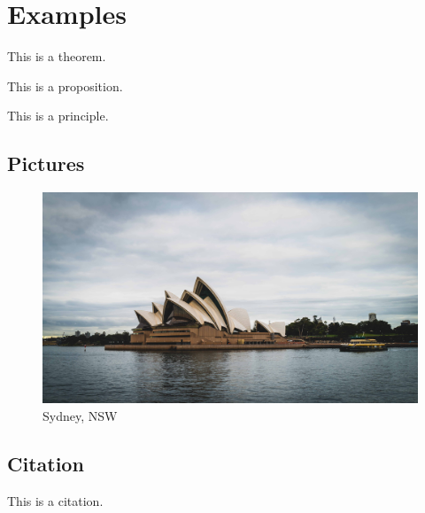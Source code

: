 \documentclass{article}
\begin{document}
\section{Examples}

\begin{theorem}
    This is a theorem.
\end{theorem}

\begin{proposition}
    This is a proposition.
\end{proposition}

\begin{principle}
    This is a principle.
\end{principle}


\subsection{Pictures}

\begin{figure}[htbp]
    \center
    \includegraphics[scale=0.06]{img/photo.jpg}
    \caption{Sydney, NSW}
\end{figure}

\subsection{Citation}

This is a citation\cite{Eg}.

\newpage





\end{document}
